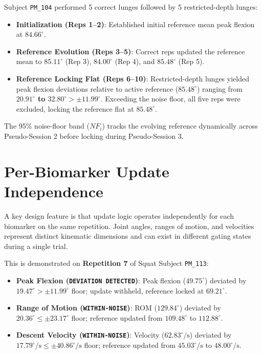Subject \texttt{PM\_104} performed 5 correct lunges followed by 5 restricted-depth lunges:
\begin{itemize}
  \item \textbf{Initialization (Reps 1–2)}: Established initial reference mean peak flexion at \textbf{$84.66^\circ$}.
  \item \textbf{Reference Evolution (Reps 3–5)}: Correct reps updated the reference mean to \textbf{$85.11^\circ$} (Rep 3), \textbf{$84.00^\circ$} (Rep 4), and \textbf{$85.48^\circ$} (Rep 5).
  \item \textbf{Reference Locking Flat (Reps 6–10)}: Restricted-depth lunges yielded peak flexion deviations relative to active reference ($85.48^\circ$) ranging from \textbf{$20.91^\circ$ to $32.80^\circ > \pm 11.99^\circ$}. Exceeding the noise floor, all five reps were excluded, locking the reference flat at \textbf{$85.48^\circ$}.
\end{itemize}

The 95\% noise-floor band ($NF_i$) tracks the evolving reference dynamically across Pseudo-Session 2 before locking during Pseudo-Session 3.



\section{Per-Biomarker Update Independence}
\label{sec:11-4-per-biomarker-update-independence}


A key design feature is that update logic operates independently for each biomarker on the same repetition. Joint angles, ranges of motion, and velocities represent distinct kinematic dimensions and can exist in different gating states during a single trial.

This is demonstrated on \textbf{Repetition 7} of Squat Subject \texttt{PM\_113}:
\begin{itemize}
  \item \textbf{Peak Flexion (\texttt{DEVIATION DETECTED})}: Peak flexion ($49.75^\circ$) deviated by $19.47^\circ > \pm 11.99^\circ$ floor; update withheld, reference locked at \textbf{$69.21^\circ$}.
  \item \textbf{Range of Motion (\texttt{WITHIN-NOISE})}: ROM ($129.84^\circ$) deviated by $20.36^\circ \le \pm 23.17^\circ$ floor; reference updated from $109.48^\circ$ to \textbf{$112.88^\circ$}.
  \item \textbf{Descent Velocity (\texttt{WITHIN-NOISE})}: Velocity ($62.83^\circ/\text{s}$) deviated by $17.79^\circ/\text{s} \le \pm 40.86^\circ/\text{s}$ floor; reference updated from $45.03^\circ/\text{s}$ to \textbf{$48.00^\circ/\text{s}$}.
\end{itemize}

